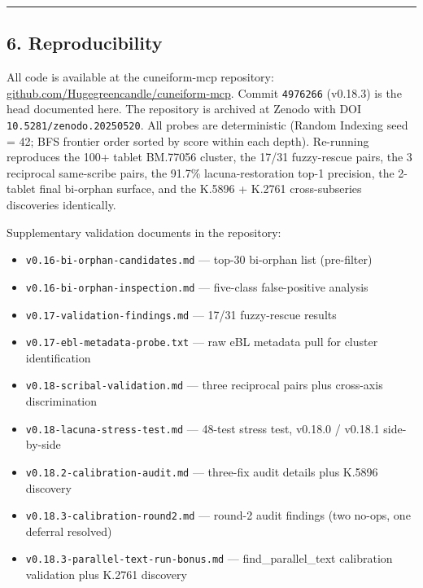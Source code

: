 \documentclass[
  11pt,
  letterpaper,
]{article}
\providecommand{\tightlist}{%
  \setlength{\itemsep}{0pt}\setlength{\parskip}{0pt}}
\begin{document}
\begin{center}\rule{0.5\linewidth}{0.5pt}\end{center}

\subsection{6. Reproducibility}\label{reproducibility}

All code is available at the cuneiform-mcp repository:
\href{https://github.com/Hugegreencandle/cuneiform-mcp}{github.com/Hugegreencandle/cuneiform-mcp}.
Commit \texttt{4976266} (v0.18.3) is the head documented here. The
repository is archived at Zenodo with DOI
\texttt{10.5281/zenodo.20250520}. All probes are deterministic (Random
Indexing seed = 42; BFS frontier order sorted by score within each
depth). Re-running reproduces the 100+ tablet BM.77056 cluster, the
17/31 fuzzy-rescue pairs, the 3 reciprocal same-scribe pairs, the 91.7\%
lacuna-restoration top-1 precision, the 2-tablet final bi-orphan
surface, and the K.5896 + K.2761 cross-subseries discoveries
identically.

Supplementary validation documents in the repository:

\begin{itemize}
\tightlist
\item
  \texttt{v0.16-bi-orphan-candidates.md} --- top-30 bi-orphan list
  (pre-filter)
\item
  \texttt{v0.16-bi-orphan-inspection.md} --- five-class false-positive
  analysis
\item
  \texttt{v0.17-validation-findings.md} --- 17/31 fuzzy-rescue results
\item
  \texttt{v0.17-ebl-metadata-probe.txt} --- raw eBL metadata pull for
  cluster identification
\item
  \texttt{v0.18-scribal-validation.md} --- three reciprocal pairs plus
  cross-axis discrimination
\item
  \texttt{v0.18-lacuna-stress-test.md} --- 48-test stress test, v0.18.0
  / v0.18.1 side-by-side
\item
  \texttt{v0.18.2-calibration-audit.md} --- three-fix audit details plus
  K.5896 discovery
\item
  \texttt{v0.18.3-calibration-round2.md} --- round-2 audit findings (two
  no-ops, one deferral resolved)
\item
  \texttt{v0.18.3-parallel-text-run-bonus.md} --- find\_parallel\_text
  calibration validation plus K.2761 discovery
\end{itemize}
\end{document}
